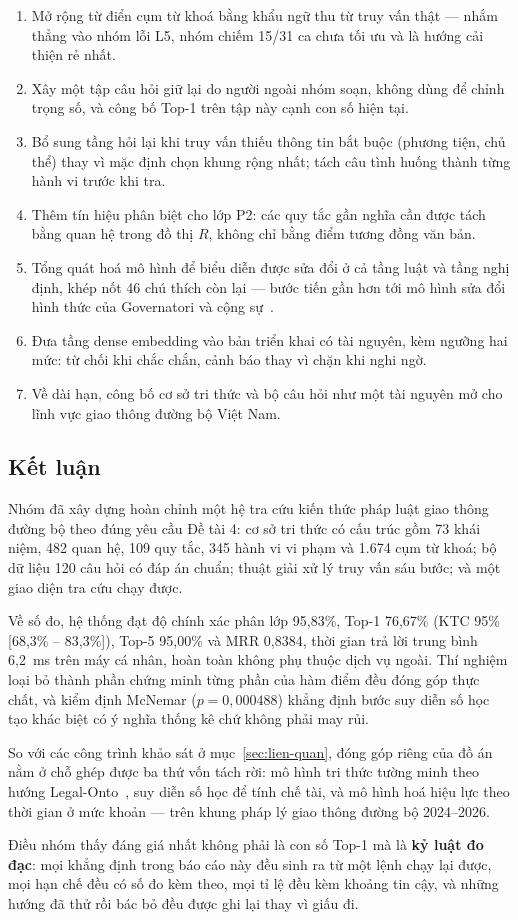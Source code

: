 \begin{enumerate}
  \item Mở rộng từ điển cụm từ khoá bằng khẩu ngữ thu từ truy vấn thật --- nhắm thẳng vào nhóm lỗi
        L5, nhóm chiếm 15/31 ca chưa tối ưu và là hướng cải thiện rẻ nhất.
  \item Xây một tập câu hỏi giữ lại do người ngoài nhóm soạn, không dùng để chỉnh trọng số, và
        công bố Top-1 trên tập này cạnh con số hiện tại.
  \item Bổ sung tầng hỏi lại khi truy vấn thiếu thông tin bắt buộc (phương tiện, chủ thể) thay vì
        mặc định chọn khung rộng nhất; tách câu tình huống thành từng hành vi trước khi tra.
  \item Thêm tín hiệu phân biệt cho lớp P2: các quy tắc gần nghĩa cần được tách bằng quan hệ trong
        đồ thị $R$, không chỉ bằng điểm tương đồng văn bản.
  \item Tổng quát hoá mô hình  để biểu diễn được sửa đổi ở cả tầng luật và tầng nghị
        định, khép nốt 46 chú thích còn lại --- bước tiến gần hơn tới mô hình sửa đổi hình thức
        của Governatori và cộng sự~\cite{governatori}.
  \item Đưa tầng dense embedding vào bản triển khai có tài nguyên, kèm ngưỡng hai mức: từ chối
        khi chắc chắn, cảnh báo thay vì chặn khi nghi ngờ.
  \item Về dài hạn, công bố cơ sở tri thức và bộ câu hỏi như một tài nguyên mở cho lĩnh vực giao
        thông đường bộ Việt Nam.
\end{enumerate}

\subsection{Kết luận}

Nhóm đã xây dựng hoàn chỉnh một hệ tra cứu kiến thức pháp luật giao thông đường bộ theo đúng
yêu cầu Đề tài 4: cơ sở tri thức có cấu trúc gồm 73 khái niệm, 482 quan hệ, 109 quy tắc, 345
hành vi vi phạm và 1.674 cụm từ khoá; bộ dữ liệu 120 câu hỏi có đáp án chuẩn; thuật giải xử lý
truy vấn sáu bước; và một giao diện tra cứu chạy được.

Về số đo, hệ thống đạt độ chính xác phân lớp 95,83\%, Top-1 76,67\% (KTC 95\% [68,3\% --
83,3\%]), Top-5 95,00\% và MRR 0,8384, thời gian trả lời trung bình 6,2~ms trên máy cá nhân,
hoàn toàn không phụ thuộc dịch vụ ngoài. Thí nghiệm loại bỏ thành phần chứng minh từng phần của
hàm điểm đều đóng góp thực chất, và kiểm định McNemar ($p = 0{,}000488$) khẳng định bước suy
diễn số học tạo khác biệt có ý nghĩa thống kê chứ không phải may rủi.

So với các công trình khảo sát ở mục~\ref{sec:lien-quan}, đóng góp riêng của đồ án nằm ở chỗ
ghép được ba thứ vốn tách rời: mô hình tri thức tường minh theo hướng
Legal-Onto~\cite{legalonto}, suy diễn số học để tính chế tài, và mô hình hoá hiệu lực theo thời
gian ở mức khoản --- trên khung pháp lý giao thông đường bộ 2024--2026.

Điều nhóm thấy đáng giá nhất không phải là con số Top-1 mà là \textbf{kỷ luật đo đạc}: mọi
khẳng định trong báo cáo này đều sinh ra từ một lệnh chạy lại được, mọi hạn chế đều có số đo
kèm theo, mọi tỉ lệ đều kèm khoảng tin cậy, và những hướng đã thử rồi bác bỏ đều được ghi lại
thay vì giấu đi.
